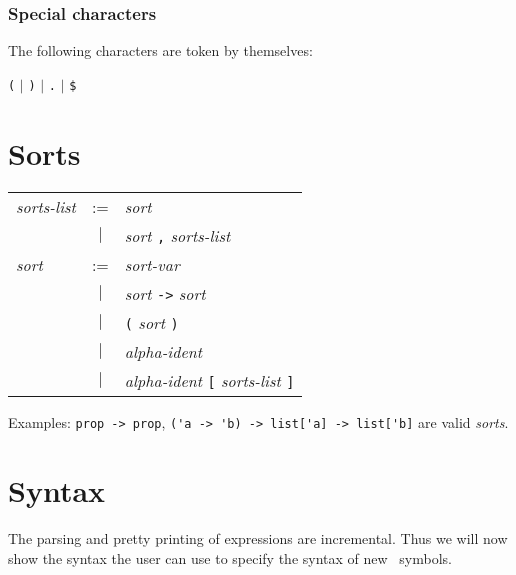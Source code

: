 \subsubsection*{Special characters}

The following characters are token by themselves:

\begin{center}
  \verb#(# $|$ \verb#)# $|$ \verb#.# $|$ \verb#$#
\end{center}

\section{Sorts}

\begin{center}
\begin{tabular}{lcl}
  {\it sorts-list} &:=& {\it sort} \\ &$|$& {\it sort} \verb#,# {\it
  sorts-list} \\
  {\it sort} &:=& {\it sort-var} \\
             &$|$& {\it sort} \verb#-># {\it sort} \\
             &$|$& \verb#(# {\it sort} \verb#)# \\
             &$|$& {\it alpha-ident} \\
             &$|$& {\it alpha-ident} \verb#[# {\it sorts-list} \verb#]#  \\
\end{tabular}
\end{center}

\medskip
\noindent Examples: \verb#prop -> prop#,
\verb#('a -> 'b) -> list['a] -> list['b]# are valid {\it sorts}.


\section{Syntax}

The parsing and pretty printing of expressions are incremental. Thus we will
now show the syntax the user can use to specify the syntax of new \AFD\ symbols.

